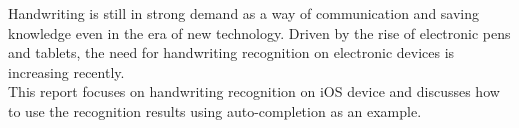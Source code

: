 Handwriting is still in strong demand as a way of communication and saving knowledge
even in the era of new technology. Driven by the rise of electronic pens and tablets,
the need for handwriting recognition on electronic devices is increasing recently.\\
This report focuses on handwriting recognition on iOS device and discusses
how to use the recognition results using auto-completion as an example.
